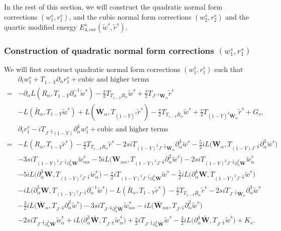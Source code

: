 \documentclass[10pt]{amsart}
\theoremstyle{remark}
\theoremstyle{definition}
\numberwithin{equation}{section}
\newcommand{\p}{\partial}
\newcommand{\al}{\alpha}
\newcommand{\f}{\frac}
\newcommand{\bw}{\mathbf{W}}
\begin{document}
In the rest of this section, we will construct the quadratic normal form corrections $(w^s_1, r^s_1)$, and the cubic normal form corrections $(w^s_2, r^s_2)$ and the quartic modified energy $E^s_{4,cor}(\tilde{w}^s, \tilde{r}^s)$.

\subsubsection{Construction of quadratic normal form corrections $(w^s_1, r^s_1)$}
We will first construct quadratic normal form corrections $(w^s_1, r^s_1)$ such that 
\begin{align*}
 &\p_t w^s_1+T_{1-\bar{Y}}\p_\al r^s_1 + \text{cubic and higher terms}\\
 =&  -\partial_\alpha L(R_\alpha , T_{1-\bar{Y}}\partial_\alpha^{-1}\tilde{w}^s) -\f{s}{2} T_{T_{1-\bar{Y}}R_{\al}}\tilde{w}^s +\f{s}{2} T_{J^{-1}\bw_{\al}} \tilde{r}^s \\
 &  - L(\bar{R}_\alpha , T_{1-Y}\tilde{w}^s) +L(\bar{\bw}_\alpha, T_{(1-\bar{Y})^2}\tilde{r}^s)  -\f{s}{2} T_{T_{1-Y}\bar{R}_{\al}}\tilde{w}^s+\f{s}{2} T_{(1-\bar{Y})^2\bar{\bw}_{\al}}\tilde{r}^s+ G_s,\\
&\p_t r^s_1-iT_{J^{-\frac{3}{2}}(1-Y)}\p_\al^4w^s_1 + \text{cubic and higher terms}\\
=& -L(R_\alpha , T_{1-\bar{Y}}\tilde{r}^s) -\f{s}{2} T_{T_{1-\bar{Y}}R_{\al}}\tilde{r}^s -2si T_{(1-Y)^2J^{-\f32}\bw_{\al}}\p^3_{\al}\tilde{w}^s -\f52iL\Big(\bw_\al, T_{(1-Y)J^{-\f32}}\p_\al^3 \tilde{w}^s\Big) \\
&-3si T_{(1-Y)^2J^{-\f32}\p^2_{\al}\bw}\tilde{w}^s_{\al\al}-5iL\Big(\bw_{\al\al}, T_{(1-Y)^2J^{-\f32}}\p_\al^2 \tilde{w}^s\Big)-2si T_{(1-Y)^2J^{-\f32}\p^3_{\al}\bw}\tilde{w}^s_{\al}\\
&-5iL\Big(\p_\al^3\bw,  T_{(1-Y)^2J^{-\f32}} \tilde{w}^s_\al\Big)-\f{s}{2}i T_{(1-Y)^2J^{-\f32}\p^4_{\al}\bw}\tilde{w}^s-\f52i L\Big(\p_\al^4\bw,  T_{(1-Y)^2J^{-\f32}} \tilde{w}^s \Big) \\
 &-iL\Big(\p_\al^5\bw,  T_{(1-Y)^2J^{-\f32}}\p_\al^{-1}\tilde{w}^s \Big) -L(\bar{R}_\alpha, T_{1-Y}\tilde{r}^s) -\f{s}{2} T_{T_{1-Y}\bar{R}_{\al}}\tilde{r}^s -2si T_{J^{-\f52}\bar{\bw}_{\al}}\p^3_{\al}\tilde{w}^s\\
 &-\f32iL\Big(\bar{\bw}_\al, T_{J^{-\f52}}\p_\al^3 \tilde{w}^s \Big) -3si T_{J^{-\f52}\p^2_{\al}\bar{\bw}}\tilde{w}^s_{\al\al}-iL\Big(\bar{\bw}_{\al\al}, T_{J^{-\f52}}\p_\al^2 \tilde{w}^s \Big)\\
 &-2si T_{J^{-\f52}\p^3_{\al}\bar{\bw}}\tilde{w}^s_{\al}+ iL\Big(\p_\al^3\bar{\bw}, T_{J^{-\f52}}\tilde{w}^s_\al \Big) +\f{s}{2}i T_{J^{-\f52}\p^4_{\al}\bar{\bw}}\tilde{w}^s-\f32iL\Big(\p_\al^4 \bar{\bw}, T_{J^{-\f52}}\tilde{w}^s \Big) + K_s.
\end{align*}
\end{document}
